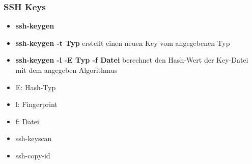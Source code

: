 \begin{frame}
\frametitle{SSH Keys}
\begin{itemize}
\item \textbf{ssh-keygen} 
\pause
\item \textbf{ssh-keygen -t Typ} erstellt einen neuen Key vom angegebenen Typ
\pause
\item \textbf{ssh-keygen -l -E Typ -f Datei} berechnet den Hash-Wert der Key-Datei mit dem angegeben Algorithmus
\pause
\item E: Hash-Typ
\pause
\item l: Fingerprint
\pause
\item f: Datei 
\pause
\item ssh-keyscan
\pause
\item ssh-copy-id
\end{itemize}
\end{frame}